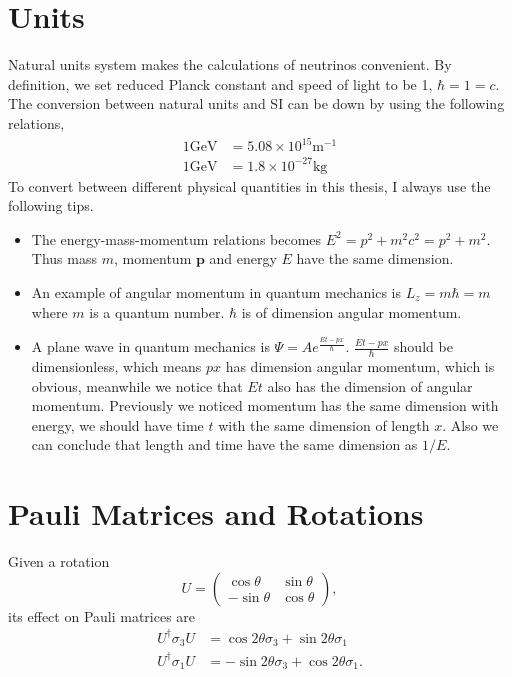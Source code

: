 \section{\label{chap:app-sec:conventions-subsec:units}Units}


Natural units system makes the calculations of neutrinos convenient. By definition, we set reduced Planck constant and speed of light to be 1, $\hbar = 1 = c$.
The conversion between natural units and SI can be down by using the following relations,
\begin{align}
   1 \mathrm{GeV} &= 5.08 \times 10^{15} \mathrm {m^{-1}} \\
   1 \mathrm{GeV} &= 1.8\times 10^{-27} \mathrm{kg}
\end{align}
To convert between different physical quantities in this thesis, I always use the following tips.
\begin{itemize}
    \item The energy-mass-momentum relations becomes $E^2 = p^2 + m^2c^2 = p^2 + m^2$. Thus mass $m$, momentum $\mathbf p$ and energy $E$ have the same dimension.
    \item An example of angular momentum in quantum mechanics is $L_z = m\hbar = m$ where $m$ is a quantum number. $\hbar$ is of dimension angular momentum.
    \item A plane wave in quantum mechanics is $\Psi = A e^{ \frac{E t - p x}{\hbar} }$. $\frac{E t - p x}{\hbar}$ should be dimensionless, which means $px$ has dimension angular momentum, which is obvious, meanwhile we notice that $E t$ also has the dimension of angular momentum. Previously we noticed momentum has the same dimension with energy, we should have time $t$ with the same dimension of length $x$. Also we can conclude that length and time have the same dimension as $1/E$.
\end{itemize}



\section{Pauli Matrices and Rotations}


Given a rotation
\begin{equation}
   U = \begin{pmatrix} \cos \theta & \sin \theta \\ -\sin\theta & \cos \theta \end{pmatrix},
\end{equation}
its effect on Pauli matrices are
\begin{align}
      U^\dagger \sigma_3 U  &=\cos 2\theta \sigma_3 + \sin 2\theta \sigma_1 \\
  U^\dagger \sigma_1 U & = -\sin 2\theta \sigma_3 + \cos 2\theta \sigma_1.
\end{align}


